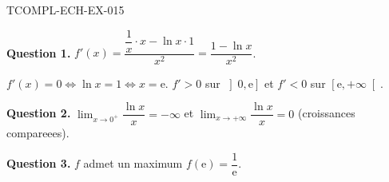 \begin{corrige}{TCOMPL-ECH-EX-015}

\textbf{Question 1.} $f'(x) = \dfrac{\dfrac{1}{x} \cdot x - \ln x \cdot 1}{x^2} = \dfrac{1 - \ln x}{x^2}$.


$f'(x) = 0 \iff \ln x = 1 \iff x = \mathrm{e}$. $f' > 0$ sur $\left]0, \mathrm{e}\right]$ et $f' < 0$ sur $\left[\mathrm{e}, +\infty\right[$.

\textbf{Question 2.} $\lim_{x \to 0^+} \dfrac{\ln x}{x} = -\infty$ et $\lim_{x \to +\infty} \dfrac{\ln x}{x} = 0$ (croissances compareees).

\textbf{Question 3.} $f$ admet un maximum $f(\mathrm{e}) = \dfrac{1}{\mathrm{e}}$.

\end{corrige}
